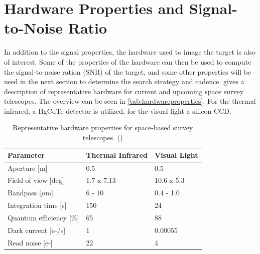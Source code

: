 \section{Hardware Properties and Signal-to-Noise Ratio}
\label{sec:modelling_hardware_SNR}

In addition to the signal properties, the hardware used to image the target is also of interest. Some of the properties of the hardware can then be used to compute the signal-to-noise ration (SNR) of the target, and some other properties will be used in the next section to determine the search strategy and cadence. \cite{2017NEOSDT} gives a description of representative hardware for current and upcoming space survey telescopes. The overview can be seen in \autoref{tab:hardwareproperties}. For the thermal infrared, a HgCdTe detector is utilized, for the visual light a silicon CCD. \\

\begin{table}[htbp]
\centering
\caption{Representative hardware properties for space-based survey telescopes. (\cite{2017NEOSDT})}
\label{tab:hardwareproperties}
\begin{tabular}{l|ll}
\textbf{Parameter}          & \textbf{Thermal Infrared} & \textbf{Visual Light} \\ \hline
Aperture {[}m{]}            & 0.5                       & 0.5                   \\
Field of view {[}deg{]}     & 1.7 x 7.13                & 10.6 x 5.3            \\
Bandpass {[}$\mu$m{]}       & 6 - 10                    & 0.4 - 1.0             \\
Integration time {[}s{]}    & 150                       & 24                    \\
Quantum efficiency {[}\%{]} & 65                        & 88                    \\
Dark current {[}e-/s{]}     & 1                         & 0.00055               \\
Read noise {[}e-{]}         & 22                        & 4
\end{tabular}
\end{table}

